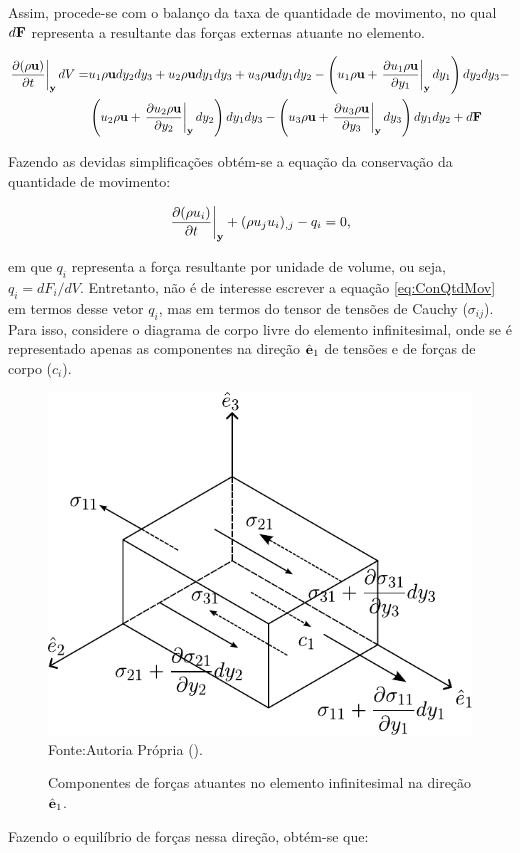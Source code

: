 \documentclass[_ArquivoPrincipal.tex]{subfiles}
\begin{document}
Assim, procede-se com o balanço da taxa de quantidade de movimento, no qual $d\mathbf{F}$ representa a resultante das forças externas atuante no elemento.

\[
    \begin{split}
        \left.\frac{\partial{(\rho\mathbf{u})}}{\partial{t}}\right|_{\mathbf{y}}dV=&u_1\rho\mathbf{u}dy_2dy_3+u_2\rho\mathbf{u}dy_1dy_3+u_3\rho\mathbf{u}dy_1dy_2-\left(u_1\rho\mathbf{u}+\left.\frac{\partial{u_1\rho\mathbf{u}}}{\partial{y_1}}\right|_{\mathbf{y}}dy_1\right)dy_2dy_3-\\
        &\left(u_2\rho\mathbf{u}+\left.\frac{\partial{u_2\rho\mathbf{u}}}{\partial{y_2}}\right|_{\mathbf{y}}dy_2\right)dy_1dy_3-\left(u_3\rho\mathbf{u}+\left.\frac{\partial{u_3\rho\mathbf{u}}}{\partial{y_3}}\right|_{\mathbf{y}}dy_3\right)dy_1dy_2+d\mathbf{F}
    \end{split}
\]

Fazendo as devidas simplificações obtém-se a equação da conservação da quantidade de movimento:

\begin{equation}
    \left.\frac{\partial{(\rho u_i)}}{\partial{t}}\right|_{\mathbf{y}}+(\rho u_ju_i)_{,j}-q_i=0\text{,}
    \label{eq:ConQtdMov}
\end{equation}

\noindent em que $q_i$ representa a força resultante por unidade de volume, ou seja, $q_i=dF_i/dV$. Entretanto, não é de interesse escrever a equação \ref{eq:ConQtdMov} em termos desse vetor $q_i$, mas em termos do tensor de tensões de Cauchy ($\sigma_{ij}$). Para isso, considere o diagrama de corpo livre do elemento infinitesimal, onde se é representado apenas as componentes na direção $\hat{\mathbf{e}}_1$ de tensões e de forças de corpo ($c_i$).

\begin{figure}[h]
    \centering
    \caption{Componentes de forças atuantes no elemento infinitesimal na direção $\hat{\mathbf{e}}_1$.}
    \includegraphics[width=.5\linewidth]{Figuras/EqFor.pdf}
    \\Fonte:Autoria Própria (\the\year).
    \label{fig:EqFor}
\end{figure}

Fazendo o equilíbrio de forças nessa direção, obtém-se que:
\end{document}
